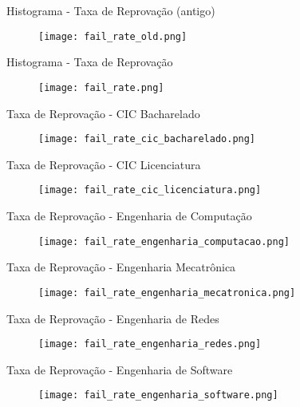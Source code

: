 \begin{frame}{Histograma - Taxa de Reprovação (antigo)}
    \begin{figure}[!ht]
    \centering
    \texttt{[image: fail\_rate\_old.png]}
    \end{figure}
\end{frame}

\begin{frame}{Histograma - Taxa de Reprovação}
    \begin{figure}[!ht]
    \centering
    \texttt{[image: fail\_rate.png]}
    \end{figure}
\end{frame}

\begin{frame}{Taxa de Reprovação - CIC Bacharelado}
    \begin{figure}[!ht]
    \centering
    \texttt{[image: fail\_rate\_cic\_bacharelado.png]}
    \end{figure}
\end{frame}

\begin{frame}{Taxa de Reprovação - CIC Licenciatura}
    \begin{figure}[!ht]
    \centering
    \texttt{[image: fail\_rate\_cic\_licenciatura.png]}
    \end{figure}
\end{frame}

\begin{frame}{Taxa de Reprovação - Engenharia de Computação}
    \begin{figure}[!ht]
    \centering
    \texttt{[image: fail\_rate\_engenharia\_computacao.png]}
    \end{figure}
\end{frame}

\begin{frame}{Taxa de Reprovação - Engenharia Mecatrônica}
    \begin{figure}[!ht]
    \centering
    \texttt{[image: fail\_rate\_engenharia\_mecatronica.png]}
    \end{figure}
\end{frame}

\begin{frame}{Taxa de Reprovação - Engenharia de Redes}
    \begin{figure}[!ht]
    \centering
    \texttt{[image: fail\_rate\_engenharia\_redes.png]}
    \end{figure}
\end{frame}

\begin{frame}{Taxa de Reprovação - Engenharia de Software}
    \begin{figure}[!ht]
    \centering
    \texttt{[image: fail\_rate\_engenharia\_software.png]}
    \end{figure}
\end{frame}

